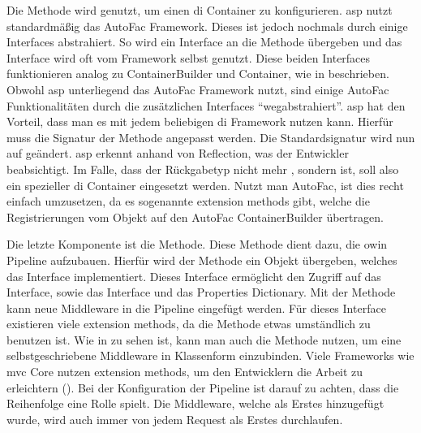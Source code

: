 Die  Methode wird genutzt, um einen \gls{di} Container zu konfigurieren. \gls{asp} nutzt standardmäßig das AutoFac Framework. Dieses ist jedoch nochmals durch einige Interfaces abstrahiert. So wird ein  Interface an die Methode übergeben und das  Interface wird oft vom Framework selbst genutzt. Diese beiden Interfaces funktionieren analog zu ContainerBuilder und Container, wie in  beschrieben. Obwohl \gls{asp} unterliegend das AutoFac Framework nutzt, sind einige AutoFac Funktionalitäten durch die zusätzlichen Interfaces \enquote{wegabstrahiert}. \gls{asp} hat den Vorteil, dass man es mit jedem beliebigen \gls{di} Framework nutzen kann. Hierfür muss die Signatur der  Methode angepasst werden. Die Standardsignatur  wird nun auf  geändert. \gls{asp} erkennt anhand von Reflection, was der Entwickler beabsichtigt. Im Falle, dass der Rückgabetyp nicht mehr , sondern  ist, soll also ein spezieller \gls{di} Container eingesetzt werden. Nutzt man AutoFac, ist dies recht einfach umzusetzen, da es sogenannte extension methods gibt, welche die Registrierungen vom  Objekt auf den AutoFac ContainerBuilder übertragen.

Die letzte Komponente ist die  Methode. Diese Methode dient dazu, die \gls{owin} Pipeline aufzubauen. Hierfür wird der Methode ein Objekt übergeben, welches das  Interface implementiert. Dieses Interface ermöglicht den Zugriff auf das  Interface, sowie das  Interface und das Properties Dictionary. Mit der  Methode kann neue Middleware in die Pipeline eingefügt werden. Für dieses Interface existieren viele extension methods, da die  Methode etwas umständlich zu benutzen ist. Wie in  zu sehen ist, kann man auch die  Methode nutzen, um eine selbstgeschriebene Middleware in Klassenform einzubinden. Viele Frameworks wie \zB \gls{mvc} Core nutzen extension methods, um den Entwicklern die Arbeit zu erleichtern (). Bei der Konfiguration der Pipeline ist darauf zu achten, dass die Reihenfolge eine Rolle spielt. Die Middleware, welche als Erstes hinzugefügt wurde, wird auch immer von jedem Request als Erstes durchlaufen.

